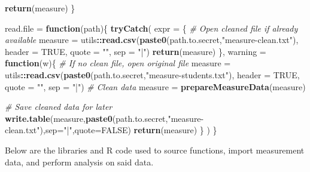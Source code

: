 \documentclass[]{article}
\newenvironment{Shaded}{\begin{snugshade}}{\end{snugshade}}
\newcommand{\CommentTok}[1]{\textcolor[rgb]{0.56,0.35,0.01}{\textit{#1}}}
\newcommand{\ControlFlowTok}[1]{\textcolor[rgb]{0.13,0.29,0.53}{\textbf{#1}}}
\newcommand{\DataTypeTok}[1]{\textcolor[rgb]{0.13,0.29,0.53}{#1}}
\newcommand{\KeywordTok}[1]{\textcolor[rgb]{0.13,0.29,0.53}{\textbf{#1}}}
\newcommand{\NormalTok}[1]{#1}
\newcommand{\OperatorTok}[1]{\textcolor[rgb]{0.81,0.36,0.00}{\textbf{#1}}}
\newcommand{\OtherTok}[1]{\textcolor[rgb]{0.56,0.35,0.01}{#1}}
\newcommand{\StringTok}[1]{\textcolor[rgb]{0.31,0.60,0.02}{#1}}
\begin{document}
\begin{Shaded}
\begin{Highlighting}[]
  \KeywordTok{return}\NormalTok{(measure)}
\NormalTok{\}}

\NormalTok{read.file =}\StringTok{ }\ControlFlowTok{function}\NormalTok{(path)\{}
  \KeywordTok{tryCatch}\NormalTok{(}
    \DataTypeTok{expr =}\NormalTok{ \{}
      \CommentTok{# Open cleaned file if already available}
\NormalTok{      measure =}\StringTok{ }\NormalTok{utils}\OperatorTok{::}\KeywordTok{read.csv}\NormalTok{(}\KeywordTok{paste0}\NormalTok{(path.to.secret,}\StringTok{"measure-clean.txt"}\NormalTok{),}
                                \DataTypeTok{header =} \OtherTok{TRUE}\NormalTok{, }\DataTypeTok{quote =} \StringTok{""}\NormalTok{, }\DataTypeTok{sep =} \StringTok{"|"}\NormalTok{)}
      \KeywordTok{return}\NormalTok{(measure)}
\NormalTok{    \},}
    \DataTypeTok{warning =} \ControlFlowTok{function}\NormalTok{(w)\{}
      \CommentTok{# If no clean file, open original file}
\NormalTok{      measure =}\StringTok{ }\NormalTok{utils}\OperatorTok{::}\KeywordTok{read.csv}\NormalTok{(}\KeywordTok{paste0}\NormalTok{(path.to.secret,}\StringTok{"measure-students.txt"}\NormalTok{),}
                                \DataTypeTok{header =} \OtherTok{TRUE}\NormalTok{, }\DataTypeTok{quote =} \StringTok{""}\NormalTok{, }\DataTypeTok{sep =} \StringTok{"|"}\NormalTok{)}
      \CommentTok{# Clean data}
\NormalTok{      measure =}\StringTok{ }\KeywordTok{prepareMeasureData}\NormalTok{(measure)}
      
      \CommentTok{# Save cleaned data for later}
      \KeywordTok{write.table}\NormalTok{(measure,}\KeywordTok{paste0}\NormalTok{(path.to.secret,}\StringTok{"measure-clean.txt"}\NormalTok{),}\DataTypeTok{sep=}\StringTok{"|"}\NormalTok{,}\DataTypeTok{quote=}\OtherTok{FALSE}\NormalTok{)}
      \KeywordTok{return}\NormalTok{(measure)}
\NormalTok{    \}}
\NormalTok{  )    }
\NormalTok{\}}
\end{Highlighting}
\end{Shaded}

Below are the libraries and R code used to source functions, import
measurement data, and perform analysis on said data.
\end{document}

